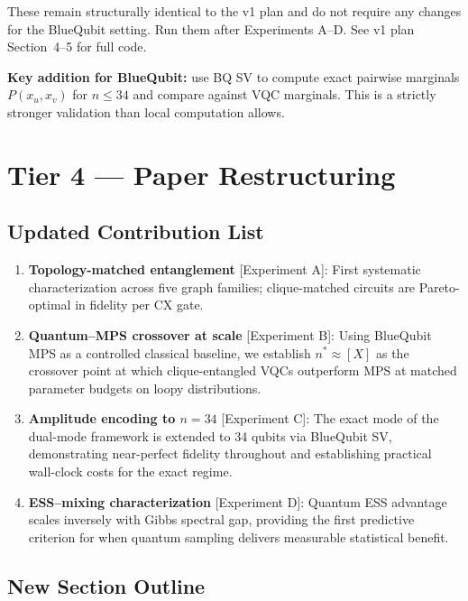 \documentclass[11pt]{article}
\begin{document}
These remain structurally identical to the v1 plan and do not
require any changes for the BlueQubit setting. Run them after
Experiments A--D. See v1 plan Section~4--5 for full code.

\textbf{Key addition for BlueQubit:} use BQ SV to compute exact
pairwise marginals $P(x_u, x_v)$ for $n \leq 34$ and compare
against VQC marginals. This is a strictly stronger validation
than local computation allows.

\section{Tier 4 --- Paper Restructuring}

\subsection{Updated Contribution List}

\begin{enumerate}
  \item \textbf{Topology-matched entanglement} [Experiment A]:
        First systematic characterization across five graph families;
        clique-matched circuits are Pareto-optimal in fidelity per
        CX gate.
  \item \textbf{Quantum--MPS crossover at scale} [Experiment B]:
        Using BlueQubit MPS as a controlled classical baseline,
        we establish $n^* \approx [X]$ as the crossover point at
        which clique-entangled VQCs outperform MPS at matched
        parameter budgets on loopy distributions.
  \item \textbf{Amplitude encoding to $n = 34$} [Experiment C]:
        The exact mode of the dual-mode framework is extended to
        34 qubits via BlueQubit SV, demonstrating near-perfect
        fidelity throughout and establishing practical wall-clock
        costs for the exact regime.
  \item \textbf{ESS--mixing characterization} [Experiment D]:
        Quantum ESS advantage scales inversely with Gibbs spectral
        gap, providing the first predictive criterion for when
        quantum sampling delivers measurable statistical benefit.
\end{enumerate}

\subsection{New Section Outline}
\end{document}
